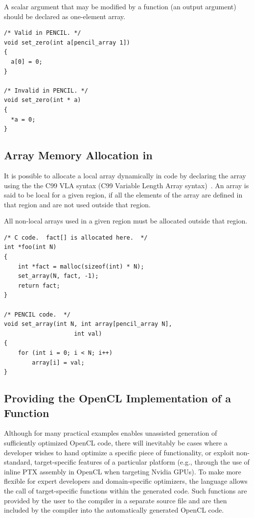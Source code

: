 A scalar argument that may be modified by a function (an output argument)
should be declared as one-element array.

\begin{lstlisting}[language=pencil]
/* Valid in PENCIL. */
void set_zero(int a[pencil_array 1])
{
  a[0] = 0;
}

/* Invalid in PENCIL. */
void set_zero(int * a)
{
  *a = 0;
}
\end{lstlisting}  

\subsection{Array Memory Allocation in \pencil}

It is possible to allocate a local array dynamically in \pencil code
by declaring the array using the the C99 VLA syntax (C99 Variable Length
Array syntax)~\cite{c99}. 
An array is said to be local for a given \pencil region, if all the
elements of the array are defined in that \pencil region and are not
used outside that region.

All non-local arrays used in a given \pencil region must be allocated
outside that \pencil region.

\begin{lstlisting}[language=pencil]
/* C code.  fact[] is allocated here.  */
int *foo(int N)
{
    int *fact = malloc(sizeof(int) * N);
    set_array(N, fact, -1);
    return fact;
}

/* PENCIL code.  */
void set_array(int N, int array[pencil_array N],
                    int val)
{
    for (int i = 0; i < N; i++)
        array[i] = val;
}

\end{lstlisting}


\subsection{Providing the OpenCL Implementation of a \pencil Function}
Although for many practical examples \pencil enables unassisted
generation of sufficiently optimized OpenCL code,
there will inevitably be cases where a developer wishes
to hand optimize a specific piece of functionality, or exploit
non-standard, target-specific features of a particular platform (e.g.,
through the use of inline PTX assembly in OpenCL when targeting Nvidia
GPUs).
To make \pencil more flexible for expert developers and
domain-specific optimizers, the language allows the call of
target-specific functions within the generated code.
Such functions are provided by the user to the \pencil compiler
in a separate source file and are then included by the compiler
into the automatically generated OpenCL code.


